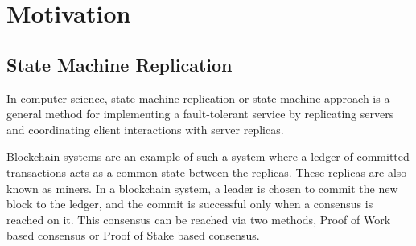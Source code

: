 \section{Motivation}

\subsection{State Machine Replication}

In computer science, state machine replication or state machine approach is a general method for implementing a fault-tolerant service by replicating servers and coordinating client interactions with server replicas.


Blockchain systems are an example of such a system where a ledger of committed transactions acts as a common state between the replicas. These replicas are also known as miners. In a blockchain system, a leader is chosen to commit the new block to the ledger, and the commit is successful only when a consensus is reached on it. This consensus can be reached via two methods, Proof of Work based consensus or Proof of Stake based consensus.









